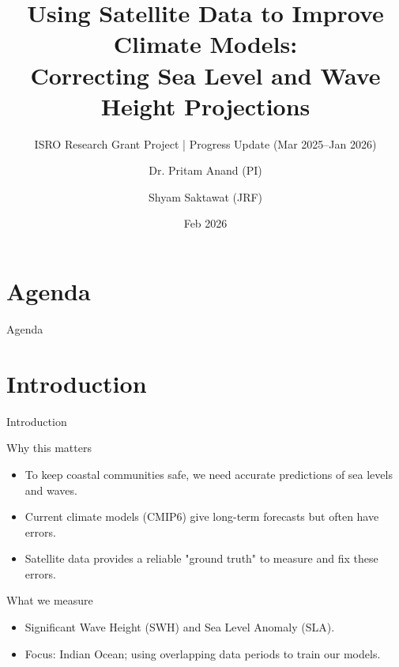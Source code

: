 \documentclass[aspectratio=169]{beamer}
\title[Bias Correction of CMIP6]{Using Satellite Data to Improve Climate Models:\\Correcting Sea Level and Wave Height Projections}
\subtitle{ISRO Research Grant Project | Progress Update (Mar 2025--Jan 2026)}
\author[Anand \and Saktawat]{Dr. Pritam Anand (PI) \and Shyam Saktawat (JRF)}
\institute[DAU]{Dhirubhai Ambani University (DAU)}
\date{Feb 2026}
\newcommand{\footerdetails}{}
\newcommand{\setfooter}[1]{\renewcommand{\footerdetails}{#1}}
\begin{document}
\begin{frame}[plain]
  \titlepage
\end{frame}

\section*{Agenda}
\begin{frame}{Agenda}
  \tableofcontents
\end{frame}

\section{Introduction}
\begin{frame}{Introduction}
  \setfooter{Motivation and scope of the research project}
  \begin{block}{Why this matters}
    \begin{itemize}
      \item To keep coastal communities safe, we need accurate predictions of sea levels and waves.
      \item Current climate models (CMIP6) give long-term forecasts but often have errors.
      \item Satellite data provides a reliable "ground truth" to measure and fix these errors.
    \end{itemize}
  \end{block}
  \begin{block}{What we measure}
    \begin{itemize}
      \item Significant Wave Height (SWH) and Sea Level Anomaly (SLA).
      \item Focus: Indian Ocean; using overlapping data periods to train our models.
    \end{itemize}
  \end{block}
\end{frame}
\end{document}
